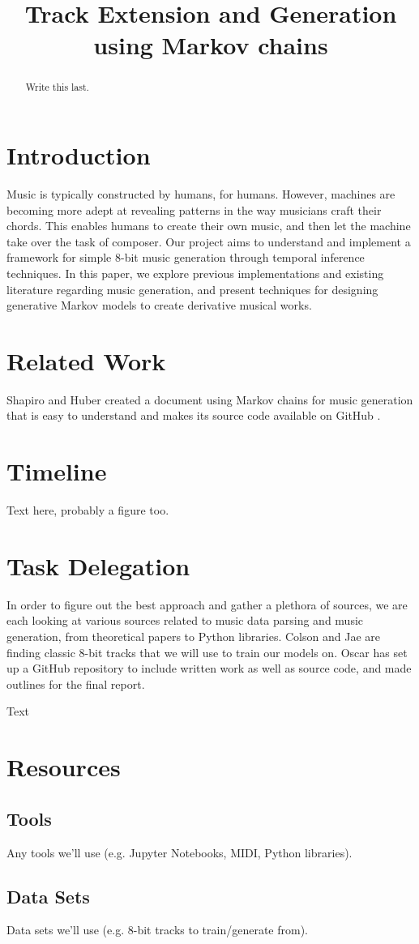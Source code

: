\documentclass{article}
\title{Track Extension and Generation using Markov chains}
\begin{document}
\maketitle

\begin{abstract}
Write this last.
\end{abstract}

\section{Introduction}
Music is typically constructed by humans, for humans. However, machines are becoming more adept at revealing patterns in the way musicians craft their chords. 
This enables humans to create their own music, and then let the machine take over the task of composer. Our project aims to understand and implement a framework 
for simple 8-bit music generation through temporal inference techniques. In this paper, we explore previous implementations and existing literature regarding music 
generation, and present techniques for designing generative Markov models to create derivative musical works.

\section{Related Work}
Shapiro and Huber created a document using Markov chains for music generation that is easy to understand and makes its source code available on 
GitHub \cite{shapiro_huber_2021}.

\section{Timeline}
Text here, probably a figure too. 

\section{Task Delegation}
In order to figure out the best approach and gather a plethora of sources, we are each looking at various sources related to music data parsing and music generation, 
from theoretical papers to Python libraries. Colson and Jae are finding classic 8-bit tracks that we will use to train our models on. Oscar has set up a GitHub repository 
to include written work as well as source code, and made outlines for the final report. 

Text

\section{Resources}

\subsection{Tools}
Any tools we'll use (e.g. Jupyter Notebooks, MIDI, Python libraries).

\subsection{Data Sets}
Data sets we'll use (e.g. 8-bit tracks to train/generate from).



\end{document}
